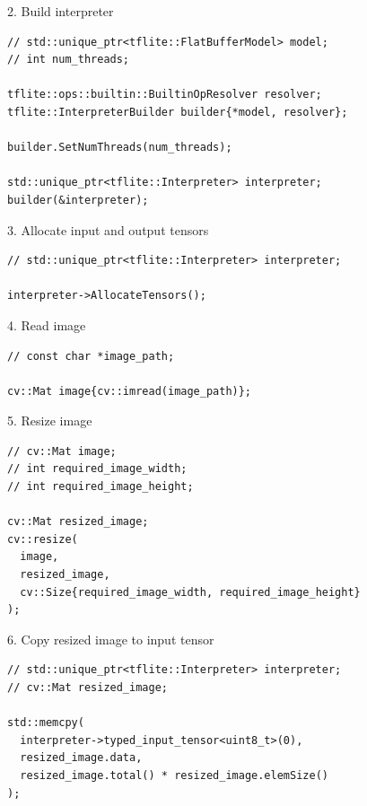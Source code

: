\begin{frame}[fragile]{2. Build interpreter}
  \lstset{basicstyle=\ttfamily\small, numbers=left, columns=fullflexible}
  \begin{lstlisting}
// std::unique_ptr<tflite::FlatBufferModel> model;
// int num_threads;

tflite::ops::builtin::BuiltinOpResolver resolver;
tflite::InterpreterBuilder builder{*model, resolver};

builder.SetNumThreads(num_threads);

std::unique_ptr<tflite::Interpreter> interpreter;
builder(&interpreter);
  \end{lstlisting}
\end{frame}

\begin{frame}[fragile]{3. Allocate input and output tensors}
  \lstset{basicstyle=\ttfamily\small, numbers=left, columns=fullflexible}
  \begin{lstlisting}
// std::unique_ptr<tflite::Interpreter> interpreter;

interpreter->AllocateTensors();
  \end{lstlisting}
\end{frame}

\begin{frame}[fragile]{4. Read image}
  \lstset{basicstyle=\ttfamily\small, numbers=left, columns=fullflexible}
  \begin{lstlisting}
// const char *image_path;

cv::Mat image{cv::imread(image_path)};
  \end{lstlisting}
\end{frame}

\begin{frame}[fragile]{5. Resize image}
  \lstset{basicstyle=\ttfamily\small, numbers=left, columns=fullflexible}
  \begin{lstlisting}
// cv::Mat image;
// int required_image_width;
// int required_image_height;

cv::Mat resized_image;
cv::resize(
  image,
  resized_image,
  cv::Size{required_image_width, required_image_height}
);
  \end{lstlisting}
\end{frame}

\begin{frame}[fragile]{6. Copy resized image to input tensor}
  \lstset{basicstyle=\ttfamily\small, numbers=left, columns=fullflexible}
  \begin{lstlisting}
// std::unique_ptr<tflite::Interpreter> interpreter;
// cv::Mat resized_image;

std::memcpy(
  interpreter->typed_input_tensor<uint8_t>(0),
  resized_image.data,
  resized_image.total() * resized_image.elemSize()
);
  \end{lstlisting}
\end{frame}

